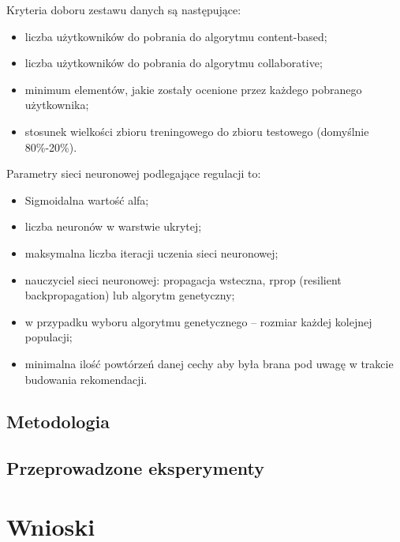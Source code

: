\documentclass[twoside]{iisthesis}
\begin{document}
		 Kryteria doboru zestawu danych są następujące:
		 
		 \begin{itemize}
		 	\item liczba użytkowników do pobrania do algorytmu content-based;
		 	\item liczba użytkowników do pobrania do algorytmu collaborative;
		 	\item minimum elementów, jakie zostały ocenione przez każdego pobranego użytkownika;
		 	\item stosunek wielkości zbioru treningowego do zbioru testowego (domyślnie 80\%-20\%).
		 \end{itemize}
		 
		 Parametry sieci neuronowej podlegające regulacji to:
		 
		 \begin{itemize}
		 	\item Sigmoidalna wartość alfa;
		 	\item liczba neuronów w warstwie ukrytej;
		 	\item maksymalna liczba iteracji uczenia sieci neuronowej;
		 	\item nauczyciel sieci neuronowej: propagacja wsteczna, rprop (resilient backpropagation) lub algorytm genetyczny;
		 	\item w przypadku wyboru algorytmu genetycznego -- rozmiar każdej kolejnej populacji;
		 	\item minimalna ilość powtórzeń  danej cechy aby była brana pod uwagę w trakcie budowania rekomendacji.
		 \end{itemize}	 
		
	\section{Metodologia}
	
	
	\section{Przeprowadzone eksperymenty}
	
	
\chapter{Wnioski}

\end{document}
